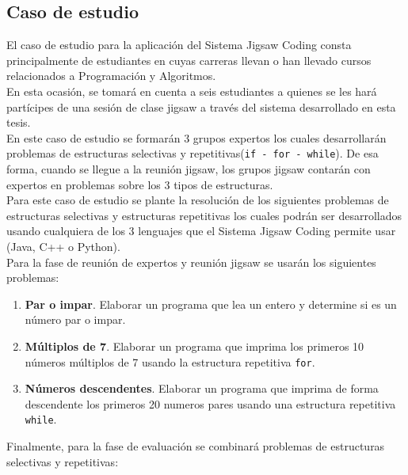 \documentclass[twoside]{article}
\begin{document}
\begin{multicols}{2}
	
\section{Caso de estudio}
El caso de estudio para la aplicación del Sistema Jigsaw Coding consta principalmente de estudiantes en cuyas carreras llevan o han llevado cursos relacionados a Programación y Algoritmos. \\

En esta ocasión, se tomará en cuenta a seis estudiantes a quienes se les hará partícipes de una sesión de clase jigsaw a través del sistema desarrollado en esta tesis.\\

En este caso de estudio se formarán 3 grupos expertos los cuales desarrollarán problemas de estructuras selectivas y repetitivas(\texttt{if - for - while}). De esa forma, cuando se llegue a la reunión jigsaw, los grupos jigsaw contarán con expertos en problemas sobre los 3 tipos de estructuras.\\

Para este caso de estudio se plante la resolución de los siguientes problemas de estructuras selectivas y estructuras repetitivas los cuales podrán ser desarrollados usando cualquiera de los 3 lenguajes que el Sistema Jigsaw Coding permite usar (Java, C++ o Python).\\

Para la fase de reunión de expertos y reunión jigsaw se usarán los siguientes problemas:

\begin{enumerate}
	\item \textbf{Par o impar}. Elaborar un programa que lea un entero y determine si es un número par o impar.
	\item \textbf{Múltiplos de 7}. Elaborar un programa que imprima los primeros 10 números múltiplos de 7 usando la estructura repetitiva \texttt{for}.
	\item \textbf{Números descendentes}. Elaborar un programa que imprima de forma descendente los primeros 20 numeros pares usando una estructura repetitiva \texttt{while}.
\end{enumerate}

Finalmente, para la fase de evaluación se combinará problemas de estructuras selectivas y repetitivas:


\end{multicols}
\end{document}
